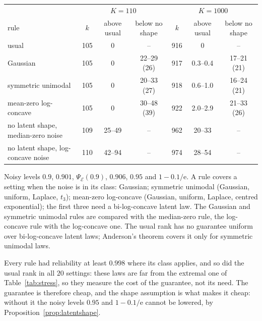 \documentclass[lineno]{biometrika}
\begin{document}
\begin{table}
{\begin{tabular}{lcccccc}
 & \multicolumn{3}{c}{$K = 110$} & \multicolumn{3}{c}{$K = 1000$} \\
rule & $k$ & above usual & below no shape & $k$ & above usual & below no shape \\
usual & 105 & 0 & -- & 916 & 0 & -- \\
Gaussian & 105 & 0 & 22--29 (26) & 917 & 0.3--0.4 & 17--21 (21) \\
symmetric unimodal & 105 & 0 & 20--33 (27) & 918 & 0.6--1.0 & 16--24 (21) \\
mean-zero log-concave & 105 & 0 & 30--48 (39) & 922 & 2.0--2.9 & 21--33 (26) \\
no latent shape, median-zero noise & 109 & 25--49 & -- & 962 & 20--33 & -- \\
no latent shape, log-concave noise & 110 & 42--94 & -- & 974 & 28--54 & -- \\
\end{tabular}}
\label{tab:sameinfo}
\begin{tabnote}
Noisy levels $0.9$, $0.901$, $\Psi_{\mathcal E}(0.9)$, $0.906$, $0.95$ and $1 - 0.1/\mathrm{e}$. A rule covers a setting when the noise is in its class: Gaussian; symmetric unimodal (Gaussian, uniform, Laplace, $t_3$); mean-zero log-concave (Gaussian, uniform, Laplace, centred exponential); the first three need a bi-log-concave latent law. The Gaussian and symmetric unimodal rules are compared with the median-zero rule, the log-concave rule with the log-concave one. The usual rank has no guarantee uniform over bi-log-concave latent laws; Anderson's theorem covers it only for symmetric unimodal laws.
\end{tabnote}
\end{table}

Every rule had reliability at least $0.998$ where its class applies, and so did the usual rank in all $20$ settings: these laws are far from the extremal one of Table~\ref{tab:stress}, so they measure the cost of the guarantee, not its need. The guarantee is therefore cheap, and the shape assumption is what makes it cheap: without it the noisy levels $0.95$ and $1 - 0.1/\mathrm{e}$ cannot be lowered, by Proposition~\ref{prop:latentshape}.
\end{document}
